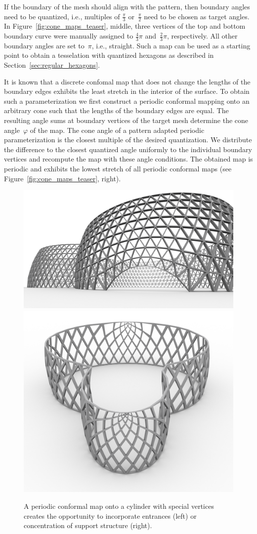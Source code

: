 \documentclass[article.tex]{subfiles}
\begin{document}
If the boundary of the mesh should align with the pattern,
then boundary angles need to be quantized, i.e., multiples of
$\tfrac{\pi}{3}$ or~$\tfrac{\pi}{2}$ need to be chosen as target
angles. In Figure~\ref{fig:cone_maps_teaser}, middle, three vertices
of the top and bottom boundary curve were manually assigned to
$\tfrac{4}{3}\pi$ and~$\tfrac{2}{3}\pi$, respectively. All other
boundary angles are set to~$\pi$, i.e., straight.  Such a map can
be used as a starting point to obtain a tesselation with quantized
hexagons as described in Section~\ref{sec:regular_hexagons}.

It is known that a discrete confomal map that does not change the lengths of the 
boundary edges exhibits the least stretch in the interior of the surface.
To obtain such a parameterization we first construct a periodic conformal 
mapping onto an
arbitrary cone such that the lengths of the boundary edges are equal. The resulting angle sums at boundary vertices of the
target mesh determine the cone angle~$\varphi$ of the map. The cone angle of
a pattern adapted periodic parameterization is the closest multiple of the 
desired quantization. We distribute the difference to the closest
quantized angle uniformly to the individual boundary vertices and
recompute the map with these angle conditions. The obtained map is 
periodic and exhibits the lowest stretch of all periodic conformal maps (see
Figure~\ref{fig:cone_maps_teaser}, right).  

\begin{figure}[bt]
  \centering
  \includegraphics[width=.52\linewidth]{images/wanda_entrances2.png}
  \hspace{.5cm}
  \includegraphics[width=.32\linewidth]{images/wanda_diagrid2.png}
  \caption{A periodic conformal map onto a cylinder with special
    vertices creates the opportunity to incorporate entrances (left)
    or concentration of support structure (right).}
  \label{fig:entrance}
\end{figure}
\end{document}

